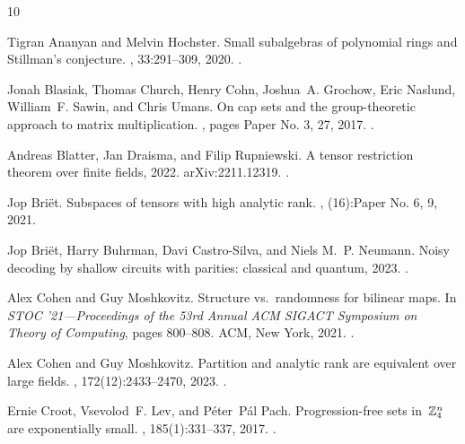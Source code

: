 \documentclass[10pt]{article}
\newcommand{\1}{\mathbf{1}}
\begin{document}
\begin{thebibliography}{10}

Tigran Ananyan and Melvin Hochster.
\newblock Small subalgebras of polynomial rings and {S}tillman's conjecture.
, 33:291--309, 2020.
\newblock \href {https://doi.org/10.1090/jams/932} {}.

Jonah Blasiak, Thomas Church, Henry Cohn, Joshua~A. Grochow, Eric Naslund, William~F. Sawin, and Chris Umans.
\newblock On cap sets and the group-theoretic approach to matrix multiplication.
, pages Paper No. 3, 27, 2017.
\newblock \href {https://doi.org/10.19086/da.1245} {}.

Andreas Blatter, Jan Draisma, and Filip Rupniewski.
\newblock A tensor restriction theorem over finite fields, 2022.
\newblock arXiv:2211.12319.
\newblock \href {https://doi.org/10.48550/ARXIV.2211.12319} {}.

Jop Bri\"{e}t.
\newblock Subspaces of tensors with high analytic rank.
, (16):Paper No. 6, 9, 2021.

Jop Briët, Harry Buhrman, Davi Castro-Silva, and Niels M.~P. Neumann.
\newblock Noisy decoding by shallow circuits with parities: classical and quantum, 2023.
\newblock \href {https://doi.org/10.48550/ARXIV.2302.02870} {}.

Alex Cohen and Guy Moshkovitz.
\newblock Structure vs.\ randomness for bilinear maps.
\newblock In {\em S{TOC} '21---{P}roceedings of the 53rd {A}nnual {ACM} {SIGACT} {S}ymposium on {T}heory of {C}omputing}, pages 800--808. ACM, New York, 2021.
\newblock \href {https://doi.org/10.1145/3406325.3451007} {}.

Alex Cohen and Guy Moshkovitz.
\newblock Partition and analytic rank are equivalent over large fields.
, 172(12):2433--2470, 2023.
\newblock \href {https://doi.org/10.1215/00127094-2022-0086} {}.

Ernie Croot, Vsevolod~F. Lev, and P\'{e}ter~P\'{a}l Pach.
\newblock Progression-free sets in~{$\Bbb Z^n_4$} are exponentially small.
, 185(1):331--337, 2017.
\newblock \href {https://doi.org/10.4007/annals.2017.185.1.7} {}.


\end{thebibliography}
\end{document}
